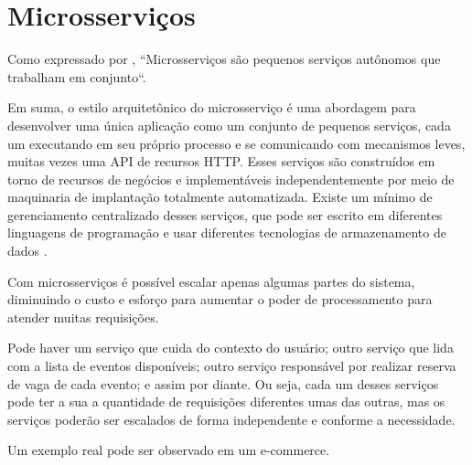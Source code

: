 \chapter{Microsserviços}\label{microservicos}

Como expressado por
\cite{building-microservices}, ``Microsserviços são pequenos serviços
autônomos que trabalham em conjunto``.

\begin{citacao}
Em suma, o estilo arquitetônico do microsserviço é uma abordagem para desenvolver
uma única aplicação como um conjunto de pequenos serviços, cada um executando em seu próprio processo e se comunicando
com mecanismos leves, muitas vezes uma API de recursos HTTP. Esses serviços são construídos em torno de recursos de
negócios e implementáveis independentemente por meio de maquinaria de implantação totalmente automatizada.
Existe um mínimo de gerenciamento centralizado desses serviços, que pode ser escrito em diferentes linguagens de
programação e usar diferentes tecnologias de armazenamento de dados \cite{martin-fowler-microservices}.
\end{citacao}

Com microsserviços é possível escalar apenas algumas partes do sistema, diminuindo
o custo e esforço para aumentar o poder de processamento para atender muitas requisições.

Pode haver um serviço que cuida do contexto do usuário; outro serviço que lida com a
lista de eventos disponíveis; outro serviço responsável por realizar reserva de vaga de
cada evento; e assim por diante. Ou seja, cada um desses serviços pode ter a sua a quantidade
de requisições diferentes umas das outras, mas os serviços poderão ser escalados de forma
independente e conforme a necessidade.

Um exemplo real pode ser observado em um e-commerce.

